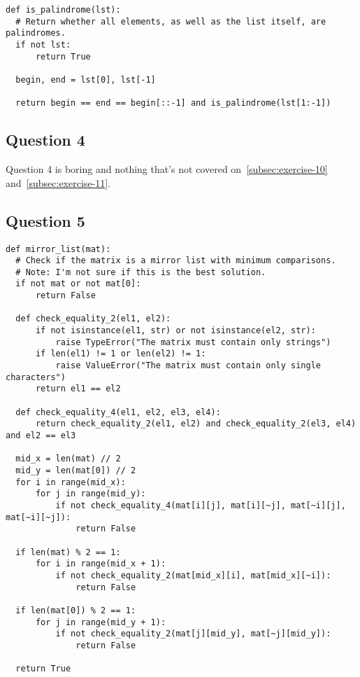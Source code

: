 \documentclass[11pt]{article}
\begin{document}
\begin{lstlisting}
def is_palindrome(lst):
  # Return whether all elements, as well as the list itself, are palindromes.
  if not lst:
      return True

  begin, end = lst[0], lst[-1]

  return begin == end == begin[::-1] and is_palindrome(lst[1:-1])
\end{lstlisting}

\subsection{Question 4}
\noindent Question 4 is boring and nothing that's not covered on~\cref{subsec:exercise-10} and~\cref{subsec:exercise-11}.

\subsection{Question 5}
\begin{lstlisting}
def mirror_list(mat):
  # Check if the matrix is a mirror list with minimum comparisons.
  # Note: I'm not sure if this is the best solution.
  if not mat or not mat[0]:
      return False

  def check_equality_2(el1, el2):
      if not isinstance(el1, str) or not isinstance(el2, str):
          raise TypeError("The matrix must contain only strings")
      if len(el1) != 1 or len(el2) != 1:
          raise ValueError("The matrix must contain only single characters")
      return el1 == el2

  def check_equality_4(el1, el2, el3, el4):
      return check_equality_2(el1, el2) and check_equality_2(el3, el4) and el2 == el3

  mid_x = len(mat) // 2
  mid_y = len(mat[0]) // 2
  for i in range(mid_x):
      for j in range(mid_y):
          if not check_equality_4(mat[i][j], mat[i][~j], mat[~i][j], mat[~i][~j]):
              return False

  if len(mat) % 2 == 1:
      for i in range(mid_x + 1):
          if not check_equality_2(mat[mid_x][i], mat[mid_x][~i]):
              return False

  if len(mat[0]) % 2 == 1:
      for j in range(mid_y + 1):
          if not check_equality_2(mat[j][mid_y], mat[~j][mid_y]):
              return False

  return True
\end{lstlisting}
\end{document}
